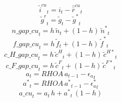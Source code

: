 \begin{dmath}
{{\tilde i^{cu}}}_{t}={{i}}_{t}-{{\hat {\bar r}^{cu}}}_{t}
\end{dmath}
\begin{dmath}
{{\tilde g^{r}}}_{t}={{\tilde g}}_{t}-{{\tilde g^*}}_{t}
\end{dmath}
\begin{dmath}
{n\_gap\_cu}_{t}={{h}}\, {{\tilde n}}_{t}+\left(1-{{h}}\right)\, {{\tilde n^*}}_{t}
\end{dmath}
\begin{dmath}
{f\_gap\_cu}_{t}={{h}}\, {{\tilde f}}_{t}+\left(1-{{h}}\right)\, {{\tilde f^*}}_{t}
\end{dmath}
\begin{dmath}
{c\_H\_gap\_cu}_{t}={{h}}\, {{\tilde c^H}}_{t}+\left(1-{{h}}\right)\, {{\tilde c^{H*}}}_{t}
\end{dmath}
\begin{dmath}
{c\_F\_gap\_cu}_{t}={{h}}\, {{\tilde c^F}}_{t}+\left(1-{{h}}\right)\, {{\tilde c^{F*}}}_{t}
\end{dmath}
\begin{dmath}
{{a}}_{t}={RHOA}\, {{a}}_{t-1}-{{\epsilon_a}}_{t}
\end{dmath}
\begin{dmath}
{{a^*}}_{t}={RHOA}\, {{a^*}}_{t-1}-{{\epsilon_a^*}}_{t}
\end{dmath}
\begin{dmath}
{a\_cu}_{t}={{a}}_{t}\, {{h}}+{{a^*}}_{t}\, \left(1-{{h}}\right)
\end{dmath}
